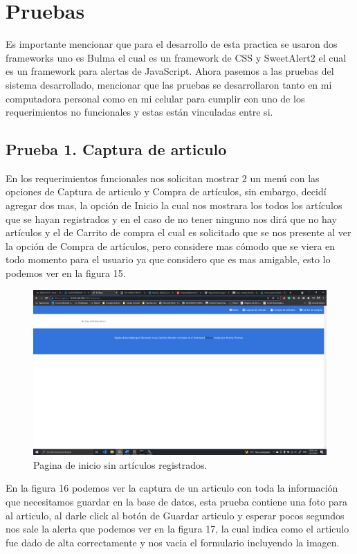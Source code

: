 \documentclass[11pt]{article}
\begin{document}
	\section{Pruebas}
	Es importante mencionar que para el desarrollo de esta practica se usaron dos frameworks uno es Bulma el cual es un framework de CSS y SweetAlert2 el cual es un framework para alertas de JavaScript. Ahora pasemos a las pruebas del sistema desarrollado, mencionar que las pruebas se desarrollaron tanto en mi computadora personal como en mi celular para cumplir con uno de los requerimientos no funcionales y estas están vinculadas entre si.
		\subsection{Prueba 1. Captura de articulo}
	En los requerimientos funcionales nos solicitan mostrar 2 un menú con las opciones de Captura de articulo y Compra de artículos, sin embargo, decidí agregar dos mas, la opción de Inicio la cual nos mostrara los todos los artículos que se hayan registrados y en el caso de no tener ninguno nos dirá que no hay artículos y el de Carrito de compra el cual es solicitado que se nos presente al ver la opción de Compra de artículos, pero considere mas cómodo que se viera en todo momento para el usuario ya que considero que es mas amigable, esto lo podemos ver en la figura 15.
		\begin{figure}[H]
			\centering
			\includegraphics[scale=0.34]{resources/serviciofuncionando.png}
			\caption{Pagina de inicio sin artículos registrados.}\label{fig:picture}
		\end{figure}
	En la figura 16 podemos ver la captura de un articulo con toda la información que necesitamos guardar en la base de datos, esta prueba contiene una foto para al articulo, al darle click al botón de Guardar articulo y esperar pocos segundos nos sale la alerta que podemos ver en la figura 17, la cual indica como el articulo fue dado de alta correctamente y nos vacia el formulario incluyendo la imagen.
\end{document}
